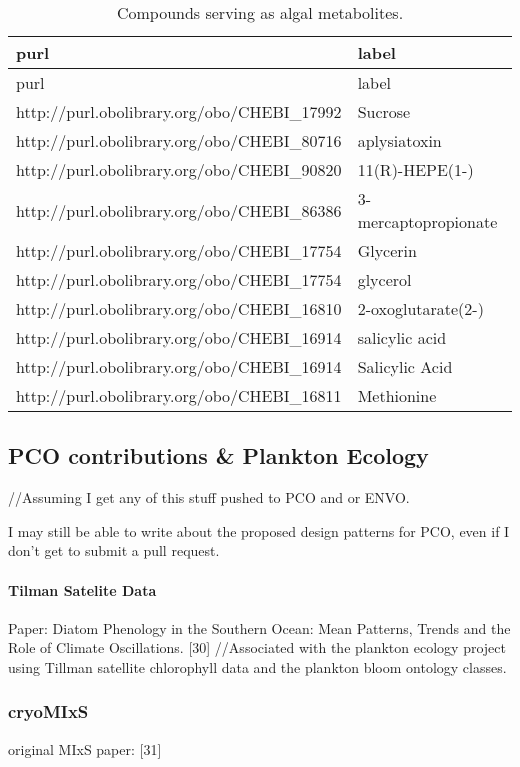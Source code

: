 \documentclass[]{article}
\let\oldparagraph\paragraph
\renewcommand{\paragraph}[1]{\oldparagraph{#1}\mbox{}}
\begin{document}
\begin{longtable}[]{@{}ll@{}}
\caption{Compounds serving as algal metabolites.}\tabularnewline
\toprule
purl & label\tabularnewline
\midrule
\endfirsthead
\toprule
purl & label\tabularnewline
\midrule
\endhead
http://purl.obolibrary.org/obo/CHEBI\_17992 & Sucrose\tabularnewline
http://purl.obolibrary.org/obo/CHEBI\_80716 &
aplysiatoxin\tabularnewline
http://purl.obolibrary.org/obo/CHEBI\_90820 &
11(R)-HEPE(1-)\tabularnewline
http://purl.obolibrary.org/obo/CHEBI\_86386 &
3-mercaptopropionate\tabularnewline
http://purl.obolibrary.org/obo/CHEBI\_17754 & Glycerin\tabularnewline
http://purl.obolibrary.org/obo/CHEBI\_17754 & glycerol\tabularnewline
http://purl.obolibrary.org/obo/CHEBI\_16810 &
2-oxoglutarate(2-)\tabularnewline
http://purl.obolibrary.org/obo/CHEBI\_16914 & salicylic
acid\tabularnewline
http://purl.obolibrary.org/obo/CHEBI\_16914 & Salicylic
Acid\tabularnewline
http://purl.obolibrary.org/obo/CHEBI\_16811 & Methionine\tabularnewline
\bottomrule
\end{longtable}

\hypertarget{pco-contributions-plankton-ecology}{%
\subsection{PCO contributions \& Plankton
Ecology}\label{pco-contributions-plankton-ecology}}

//Assuming I get any of this stuff pushed to PCO and or ENVO.

I may still be able to write about the proposed design patterns for PCO,
even if I don't get to submit a pull request.

\hypertarget{tilman-satelite-data}{%
\paragraph{Tilman Satelite Data}\label{tilman-satelite-data}}

Paper: Diatom Phenology in the Southern Ocean: Mean Patterns, Trends and
the Role of Climate Oscillations. {[}30{]} //Associated with the
plankton ecology project using Tillman satellite chlorophyll data and
the plankton bloom ontology classes.

\hypertarget{cryomixs}{%
\subsubsection{cryoMIxS}\label{cryomixs}}

original MIxS paper: {[}31{]}
\end{document}
